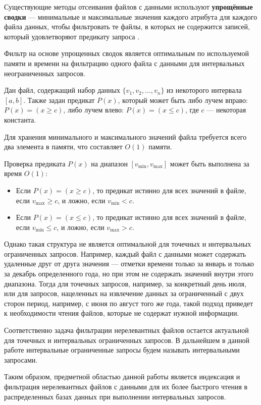 Существующие методы отсеивания файлов с данными используют \textbf{упрощённые сводки} --- минимальные и максимальные значения каждого атрибута для каждого файла данных, чтобы фильтровать те файлы, в которых не содержится записей, который удовлетворяют предикату запроса \cite{Extensible_data_skipping, Small_Materialized_Aggregates}.
\begin{theorem} \label{theorema}
    Фильтр на основе упрощенных сводок является оптимальным по используемой памяти и времени на фильтрацию одного файла с данными для интервальных неограниченных запросов.
\end{theorem}
\proof

Дан файл, содержащий набор данных $\{v_1, v_2, \ldots, v_n\}$ из некоторого интервала $[a, b]$. Также задан предикат $P(x)$, который может быть либо лучем вправо: $P(x) = (x \geq c)$, либо лучем влево: $P(x) = (x \leq c)$, где $c$ — некоторая константа.

Для хранения минимального и максимального значений файла требуется всего два элемента в памяти, что составляет $O(1)$ памяти.

Проверка предиката $P(x)$ на диапазон $[v_{\min}, v_{\max}]$ может быть выполнена за время $O(1)$:
\begin{itemize}
    \item Если $P(x) = (x \geq c)$, то предикат истинно для всех значений в файле, если $v_{\max} \geq c$, и ложно, если $v_{\min} < c$.
    \item Если $P(x) = (x \leq c)$, то предикат истинно для всех значений в файле, если $v_{\min} \leq c$, и ложно, если $v_{\max} > c$.
\end{itemize}
\thmp

Однако такая структура не является оптимальной для точечных и интервальных ограниченных запросов. Например, каждый файл с данными может содержать удаленные друг от друга значения --- отметки времени только за январь и только за декабрь определенного года, но при этом не содержать значений внутри этого диапазона. Тогда для точечных запросов, например, за конкретный день июля, или для запросов, нацеленных на извлечение данных за ограниченный с двух сторон период, например, с июня по август того же года, такой подход приведет к необходимости чтения файлов, которые не содержат нужной информации.

Соответственно задача фильтрации нерелевантных файлов остается актуальной для точечных и интервальных ограниченных запросов. В дальнейшем в данной работе интервальные ограниченные запросы будем называть интервальными запросами.

Таким образом, предметной областью данной работы является индексация и фильтрация нерелевантных файлов с данными для их более быстрого чтения в распределенных базах данных при выполнении интервальных запросов.
